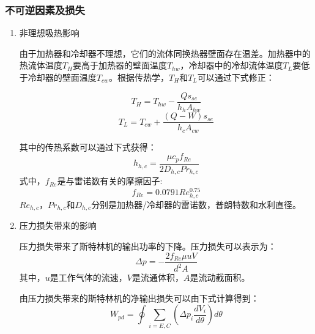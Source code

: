 
\subsubsection{不可逆因素及损失}

\begin{enumerate}[label=(\arabic*)]
\item 非理想吸热影响

\setlength\parindent{2em}由于加热器和冷却器不理想，它们的流体同换热器壁面存在温差。加热器中的热流体温度$T_{H}$要高于加热器的壁面温度$T_{hw}$，冷却器中的冷却流体温度$T_L$要低于冷却器的壁面温度$T_{cw}$。根据传热学，$T_{H}$和$T_{L}$可以通过下式修正：

\begin{equation}
	T_H = T_{hw} - \frac{Qs_{se}}{h_hA_{hw}}
	\label{eq:T_H}
\end{equation}
\begin{equation}
	T_L = T_{cw} + \frac{(Q-W)s_{se}}{h_cA_{cw}}
	\label{eq:T_L}
\end{equation}

其中的传热系数可以通过下式获得\cite{Babaelahi2015}：
\begin{equation}
	h_{h,c} = \frac{\mu c_pf_{Re}}{2D_{h,c}Pr_{h,c}}
\end{equation}
式中，$f_{Re}$是与雷诺数有关的摩擦因子:
\begin{equation}
	f_{Re} = 0.0791Re_{h,c}^{0.75}
\end{equation}
$Re_{h,c}$，$Pr_{h,c}$和$D_{h,c}$分别是加热器/冷却器的雷诺数，普朗特数和水利直径。

\item 压力损失带来的影响

压力损失带来了斯特林机的输出功率的下降。压力损失可以表示为\cite{Urieli1984}：
\begin{equation}
	\Delta p = -\frac{2f_{Re}\mu u V}{d^2A}
\end{equation}
其中，$u$是工作气体的流速，$V$是流通体积，$A$是流动截面积。

由压力损失带来的斯特林机的净输出损失可以由下式计算得到：
\begin{equation}
	W_{pd} = \oint\underset{i = E,C}{\sum}(\Delta p_{i}\frac{dV_i}{d\theta})d\theta
\end{equation}


\end{enumerate}
